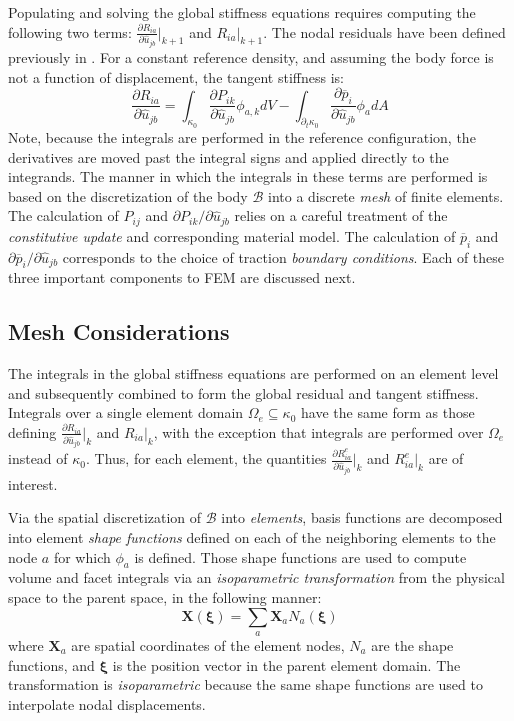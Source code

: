 Populating and solving the global stiffness equations requires computing the following two terms: $\frac{\partial R_{ia}}{\partial \hat{u}_{jb}} \big|_{k+1}$ and $R_{ia}\big|_{k+1}$. The nodal residuals have been defined previously in . For a constant reference density, and assuming the body force is not a function of displacement, the tangent stiffness is:
\begin{equation}
\frac{\partial R_{ia}}{\partial \hat{u}_{jb}} = \int_{\kappa_0}\frac{\partial P_{ik}}{\partial \hat{u}_{jb}}\phi_{a,k}dV - \int_{\partial_t\kappa_0}\frac{\partial \overline{p}_i}{\partial \hat{u}_{jb}}\phi_adA
\end{equation}
Note, because the integrals are performed in the reference configuration, the derivatives are moved past the integral signs and applied directly to the integrands. The manner in which the integrals in these terms are performed is based on the discretization of the body $\mathcal{B}$ into a discrete \textit{mesh} of finite elements. The calculation of $P_{ij}$ and $\partial{P}_{ik}/\partial{\hat{u}_{jb}}$ relies on a careful treatment of the \textit{constitutive update} and corresponding material model. The calculation of $\overline{p}_i$ and $\partial{\overline{p}_i}/\partial{\hat{u}_{jb}}$ corresponds to the choice of traction \textit{boundary conditions}. Each of these three important components to FEM are discussed next.

\subsection{Mesh Considerations}

The integrals in the global stiffness equations are performed on an element level and subsequently combined to form the global residual and tangent stiffness. Integrals over a single element domain $\Omega_e \subseteq \kappa_0$ have the same form as those defining $\frac{\partial R_{ia}}{\partial \hat{u}_{jb}} \big|_k$ and $R_{ia}\big|_k$, with the exception that integrals are performed over $\Omega_e$ instead of $\kappa_0$. Thus, for each element, the quantities $\frac{\partial R^e_{ia}}{\partial \hat{u}_{jb}} \big|_k$ and $R^e_{ia}\big|_k$ are of interest.

Via the spatial discretization of $\mathcal{B}$ into \textit{elements}, basis functions are decomposed into element \textit{shape functions} defined on each of the neighboring elements to the node $a$ for which $\phi_a$ is defined. Those shape functions are used to compute volume and facet integrals via an \textit{isoparametric transformation} from the physical space to the parent space, in the following manner:
\begin{equation}
\bm{X}(\bm{\xi}) = \sum\limits_{a}\bm{X}_a{N}_a(\bm{\xi})
\end{equation}
where $\bm{X}_a$ are spatial coordinates of the element nodes, $N_a$ are the shape functions, and $\bm{\xi}$ is the position vector in the parent element domain. The transformation is \textit{isoparametric} because the same shape functions are used to interpolate nodal displacements.


